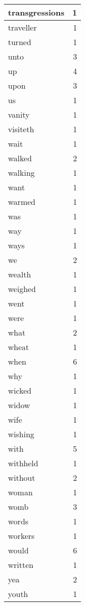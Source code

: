 \begin{center}
\begin{longtable}{l|r}
transgressions & 1 \\ \hline
traveller & 1 \\ \hline
turned & 1 \\ \hline
unto & 3 \\ \hline
up & 4 \\ \hline
upon & 3 \\ \hline
us & 1 \\ \hline
vanity & 1 \\ \hline
visiteth & 1 \\ \hline
wait & 1 \\ \hline
walked & 2 \\ \hline
walking & 1 \\ \hline
want & 1 \\ \hline
warmed & 1 \\ \hline
was & 1 \\ \hline
way & 1 \\ \hline
ways & 1 \\ \hline
we & 2 \\ \hline
wealth & 1 \\ \hline
weighed & 1 \\ \hline
went & 1 \\ \hline
were & 1 \\ \hline
what & 2 \\ \hline
wheat & 1 \\ \hline
when & 6 \\ \hline
why & 1 \\ \hline
wicked & 1 \\ \hline
widow & 1 \\ \hline
wife & 1 \\ \hline
wishing & 1 \\ \hline
with & 5 \\ \hline
withheld & 1 \\ \hline
without & 2 \\ \hline
woman & 1 \\ \hline
womb & 3 \\ \hline
words & 1 \\ \hline
workers & 1 \\ \hline
would & 6 \\ \hline
written & 1 \\ \hline
yea & 2 \\ \hline
youth & 1 \\ \hline
\end{longtable}
\end{center}



